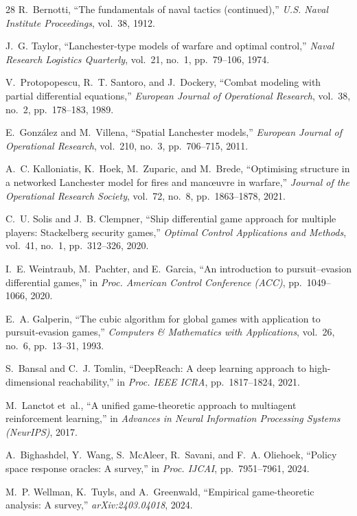 \documentclass[12pt,a4paper]{article}
\begin{document}
\begin{thebibliography}{28}
R.~Bernotti, ``The fundamentals of naval tactics (continued),'' \emph{U.S.
Naval Institute Proceedings}, vol.~38, 1912.

J.~G. Taylor, ``Lanchester-type models of warfare and optimal control,''
\emph{Naval Research Logistics Quarterly}, vol.~21, no.~1, pp.~79--106,
1974.

V.~Protopopescu, R.~T. Santoro, and J.~Dockery, ``Combat modeling with
partial differential equations,'' \emph{European Journal of Operational
Research}, vol.~38, no.~2, pp.~178--183, 1989.

E.~Gonz{\'a}lez and M.~Villena, ``Spatial Lanchester models,'' \emph{European
Journal of Operational Research}, vol.~210, no.~3, pp.~706--715, 2011.

A.~C. Kalloniatis, K.~Hoek, M.~Zuparic, and M.~Brede, ``Optimising
structure in a networked Lanchester model for fires and man{\oe}uvre in
warfare,'' \emph{Journal of the Operational Research Society}, vol.~72,
no.~8, pp.~1863--1878, 2021.

C.~U. Solis and J.~B. Clempner, ``Ship differential game approach for
multiple players: Stackelberg security games,'' \emph{Optimal Control
Applications and Methods}, vol.~41, no.~1, pp.~312--326, 2020.

I.~E. Weintraub, M.~Pachter, and E.~Garcia, ``An introduction to
pursuit--evasion differential games,'' in \emph{Proc. American Control
Conference (ACC)}, pp.~1049--1066, 2020.

E.~A. Galperin, ``The cubic algorithm for global games with application to
pursuit-evasion games,'' \emph{Computers \& Mathematics with Applications},
vol.~26, no.~6, pp.~13--31, 1993.

S.~Bansal and C.~J. Tomlin, ``DeepReach: A deep learning approach to
high-dimensional reachability,'' in \emph{Proc. IEEE ICRA}, pp.~1817--1824,
2021.

M.~Lanctot et~al., ``A unified game-theoretic approach to multiagent
reinforcement learning,'' in \emph{Advances in Neural Information
Processing Systems (NeurIPS)}, 2017.

A.~Bighashdel, Y.~Wang, S.~McAleer, R.~Savani, and F.~A. Oliehoek,
``Policy space response oracles: A survey,'' in \emph{Proc. IJCAI},
pp.~7951--7961, 2024.

M.~P. Wellman, K.~Tuyls, and A.~Greenwald, ``Empirical game-theoretic
analysis: A survey,'' \emph{arXiv:2403.04018}, 2024.


\end{thebibliography}
\end{document}
